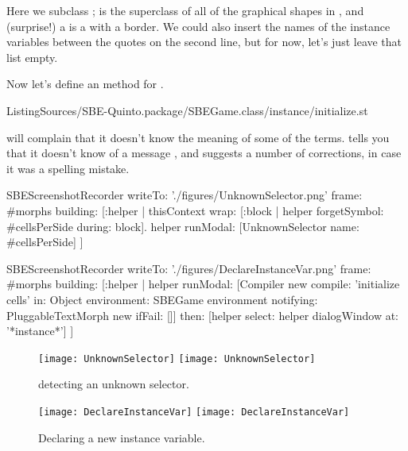 \documentclass[a4paper,10pt,twoside]{book}
\begin{document}
Here we subclass ;  is the superclass of all of the graphical shapes in \squeak, and (surprise!) a  is a  with a border.
We could also insert the names of the instance variables between the quotes on the second line, but for now, let's just leave that list empty.

Now let's define an  method for .


%
{ListingSources/SBE-Quinto.package/SBEGame.class/instance/initialize.st}


\squeak will complain that it doesn't know the meaning of some of the terms.
\squeak tells you that it doesn't know of a message , and suggests a number of corrections, in case it was a spelling mistake.


\begin{ExecuteSmalltalkScript}
SBEScreenshotRecorder writeTo: './figures/UnknownSelector.png' frame: #morphs building: [:helper |
	thisContext wrap: [:block | helper forgetSymbol: #cellsPerSide during: block].
	helper runModal: [UnknownSelector name: #cellsPerSide]
]
\end{ExecuteSmalltalkScript}
\begin{ExecuteSmalltalkScript}
SBEScreenshotRecorder writeTo: './figures/DeclareInstanceVar.png' frame: #morphs building: [:helper |
	helper
		runModal: [Compiler new
			compile: 'initialize cells'
			in: Object
			environment: SBEGame environment
			notifying: PluggableTextMorph new
			ifFail: []]
 		then: [helper select: helper dialogWindow at: '*instance*']
]
\end{ExecuteSmalltalkScript}
\begin{figure}[htb]
\begin{minipage}[t]{0.42\textwidth}
	\centering
	\ifluluelse
		{\texttt{[image: UnknownSelector]}}
		{\texttt{[image: UnknownSelector]}}
	\caption{\squeak detecting an unknown selector.\label{fig:unknownSelector}}
\end{minipage}
\hfill
\begin{minipage}[t]{0.56\textwidth}
	\centering
	\ifluluelse
		{\texttt{[image: DeclareInstanceVar]}}
		{\texttt{[image: DeclareInstanceVar]}}
	\caption{Declaring a new instance variable.\label{fig:declareInstance}}
\end{minipage}
\end{figure}
\end{document}
